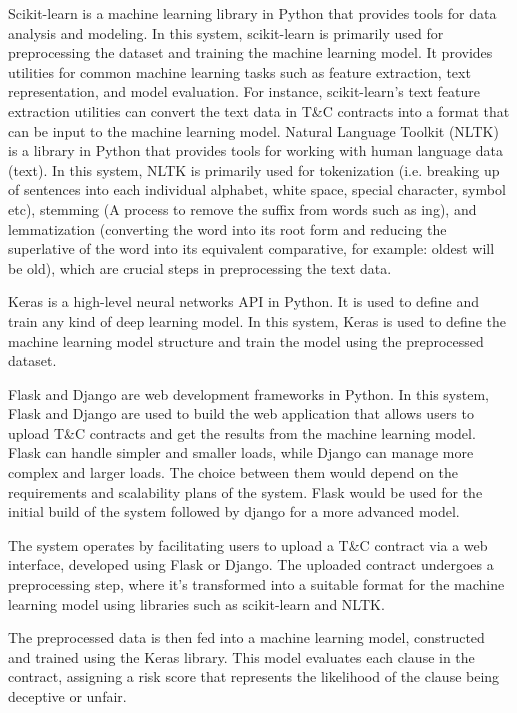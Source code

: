 Scikit-learn is a machine learning library in Python that provides tools for data analysis and modeling. In this system, scikit-learn is primarily used for preprocessing the dataset and training the machine learning model. It provides utilities for common machine learning tasks such as feature extraction, text representation, and model evaluation. For instance, scikit-learn's text feature extraction utilities can convert the text data in T&C contracts into a format that can be input to the machine learning model.
Natural Language Toolkit (NLTK) is a library in Python that provides tools for working with human language data (text).  In this system, NLTK is primarily used for tokenization (i.e. breaking up of sentences into each individual alphabet, white space, special character, symbol etc), stemming (A process to remove the suffix from words such as ing), and lemmatization (converting the word into its root form and reducing the superlative of the word into its equivalent comparative, for example: oldest will be old), which are crucial steps in preprocessing the text data.

Keras is a high-level neural networks API in Python.  
It is used to define and train any kind of deep learning model. In this system, Keras is used to define the machine learning model structure and train the model using the preprocessed dataset.

Flask and Django are web development frameworks in Python.  In this system, Flask and Django are used to build the web application that allows users to upload T&C contracts and get the results from the machine learning model. Flask can handle simpler and smaller loads, while Django can manage more complex and larger loads. The choice between them would depend on the requirements and scalability plans of the system. Flask would be used for the initial build of the system followed by django for a more advanced model. 

The system operates by facilitating users to upload a T&C contract via a web interface, developed using Flask or Django. The uploaded contract undergoes a preprocessing step, where it's transformed into a suitable format for the machine learning model using libraries such as scikit-learn and NLTK.

The preprocessed data is then fed into a machine learning model, constructed and trained using the Keras library. This model evaluates each clause in the contract, assigning a risk score that represents the likelihood of the clause being deceptive or unfair.

